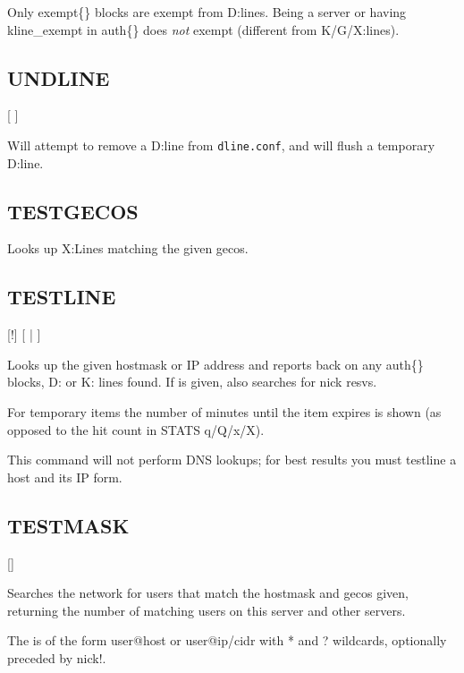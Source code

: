 	Only exempt\{\} blocks are exempt from D:lines. Being a server or having
	kline\_exempt in auth\{\} does \emph{not} exempt (different from
	K/G/X:lines).


\subsection{UNDLINE}

     [ ]

	Will attempt to remove a D:line from \nolinkurl{dline.conf}, and will
	flush a temporary D:line.


\subsection{TESTGECOS}


	Looks up X:Lines matching the given gecos.


\subsection{TESTLINE}

    [!]
    [ | ]

	Looks up the given hostmask or IP address and reports back on any
	auth\{\} blocks, D: or K: lines found. If  is
	given, also searches for nick resvs.


	For temporary items the number of minutes until the item expires
	is shown (as opposed to the hit count in STATS q/Q/x/X).


	This command will not perform DNS lookups; for best
	results you must testline a host and its IP form.


\subsection{TESTMASK}

     []

	Searches the network for users that match the hostmask and gecos given,
	returning the number of matching users on this server and other
	servers.

	The  is of the form user@host or user@ip/cidr
	with * and ? wildcards, optionally preceded by nick!.

